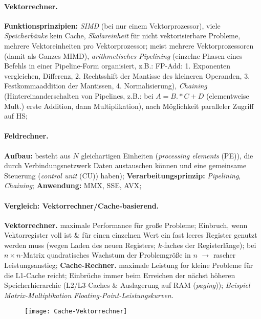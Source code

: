 \documentclass[8pt,a4paper]{article}
\begin{document}
\begin{multicols}{2}
\paragraph{Vektorrechner.} \textbf{Funktionsprinzipien:} \emph{SIMD} (bei nur
einem Vektorprozessor), viele  \emph{Speicherbänke} kein Cache,
\emph{Skalareinheit} für nicht vektorisierbare Probleme, mehrere
Vektoreinheiten pro Vektorprozessor; meist mehrere Vektorprozessoren (damit als Ganzes
MIMD), \emph{arithmetisches Pipelining} (einzelne Phasen eines Befehls in
einer Pipeline-Form organisiert, z.B.: FP-Add: 1. Exponenten
vergleichen, Differenz, 2. Rechtsshift der Mantisse des kleineren
Operanden, 3. Festkommaaddition der Mantissen, 4. Normalisierung),
\emph{Chaining} (Hintereinanderschalten von Pipelines, z.B.: bei
$A=B.*C + D$ (elementweise Mult.) erste Addition, dann
Multiplikation), nach Möglichkeit paralleler Zugriff auf HS;

\paragraph{Feldrechner.} \textbf{Aufbau:} besteht aus $N$
gleichartigen Einheiten (\emph{processing elements} (PE)), die durch
Verbindungsnetzwerk Daten austauschen können und eine gemeinsame
Steuerung (\emph{control unit} (CU)) haben);
\textbf{Verarbeitungsprinzip:} \emph{Pipelining}, \emph{Chaining};
\textbf{Anwendung:} MMX, SSE, AVX;

\paragraph{Vergleich: Vektorrechner/Cache-basierend.}
\textbf{Vektorrechner.} maximale Performance für große Probleme; Einbruch, wenn Vektorregister voll ist \& für
einen einzelnen Wert ein fast leeres Register genutzt werden muss
(wegen Laden des neuen Registers; $k$-faches der Registerlänge); bei
$n\times n$-Matrix quadratisches Wachstum der Problemgröße in $n$
$\rightarrow$ rascher Leistungsanstieg; \textbf{Cache-Rechner.}
maximale Leistung for kleine Probleme für die L1-Cache reicht;
Einbrüche immer beim Erreichen der nächst höheren Speicherhierarchie
(L2/L3-Caches \& Auslagerung auf RAM (\emph{paging}));
\emph{Beispiel Matrix-Multiplikation Floating-Point-Leistungskurven.}
\begin{figure}[H]
  \centering
\texttt{[image: Cache-Vektorrechner]}
\end{figure}


\end{multicols}
\end{document}
